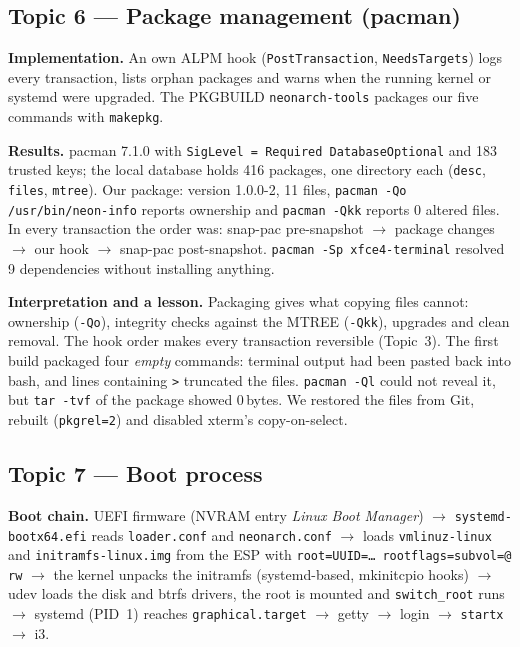 \documentclass[10.5pt,a4paper]{article}
\newcommand{\cmd}[1]{\texttt{#1}}
\begin{document}
\subsection{Topic 6 — Package management (pacman)}
\textbf{Implementation.} An own ALPM hook (\cmd{PostTransaction}, \cmd{NeedsTargets}) logs every transaction, lists orphan packages and warns when the running kernel or systemd were upgraded. The PKGBUILD \cmd{neonarch-tools} packages our five commands with \cmd{makepkg}.

\textbf{Results.} pacman 7.1.0 with \cmd{SigLevel = Required DatabaseOptional} and 183 trusted keys; the local database holds 416 packages, one directory each (\cmd{desc}, \cmd{files}, \cmd{mtree}). Our package: version 1.0.0-2, 11 files, \cmd{pacman -Qo /usr/bin/neon-info} reports ownership and \cmd{pacman -Qkk} reports 0 altered files. In every transaction the order was: snap-pac pre-snapshot $\rightarrow$ package changes $\rightarrow$ our hook $\rightarrow$ snap-pac post-snapshot. \cmd{pacman -Sp xfce4-terminal} resolved 9 dependencies without installing anything.

\textbf{Interpretation and a lesson.} Packaging gives what copying files cannot: ownership (\cmd{-Qo}), integrity checks against the MTREE (\cmd{-Qkk}), upgrades and clean removal. The hook order makes every transaction reversible (Topic~3). The first build packaged four \emph{empty} commands: terminal output had been pasted back into bash, and lines containing \cmd{>} truncated the files. \cmd{pacman -Ql} could not reveal it, but \cmd{tar -tvf} of the package showed 0\,bytes. We restored the files from Git, rebuilt (\cmd{pkgrel=2}) and disabled xterm's copy-on-select.

\subsection{Topic 7 — Boot process}
\textbf{Boot chain.} UEFI firmware (NVRAM entry \emph{Linux Boot Manager}) $\rightarrow$ \cmd{systemd-bootx64.efi} reads \cmd{loader.conf} and \cmd{neonarch.conf} $\rightarrow$ loads \cmd{vmlinuz-linux} and \cmd{initramfs-linux.img} from the ESP with \cmd{root=UUID=\ldots{} rootflags=subvol=@ rw} $\rightarrow$ the kernel unpacks the initramfs (systemd-based, mkinitcpio hooks) $\rightarrow$ udev loads the disk and btrfs drivers, the root is mounted and \cmd{switch\_root} runs $\rightarrow$ systemd (PID~1) reaches \cmd{graphical.target} $\rightarrow$ getty $\rightarrow$ login $\rightarrow$ \cmd{startx} $\rightarrow$ i3.
\end{document}
